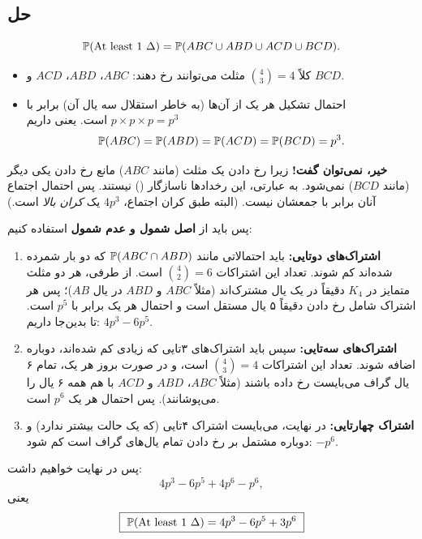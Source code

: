 \begin{center}
\end{center}

\subsection*{حل}
\[
\mathbb{P}(\text{At least 1 }\Delta)=\mathbb{P}(ABC\cup ABD\cup ACD\cup BCD).
\]
\begin{itemize}
\item کلاً $\binom43=4$ مثلث می‌توانند رخ دهند: $ABC$، $ABD$، $ACD$ و $BCD$.
\item احتمال تشکیل هر یک از آن‌ها (به خاطر استقلال سه یال آن) برابر با $p\times p\times p=p^3$ است. یعنی داریم
\[\mathbb{P}(ABC)=\mathbb{P}(ABD)=\mathbb{P}(ACD)=\mathbb{P}(BCD)=p^3 .\]
\end{itemize}

\begin{question}[آیا می‌توان گفت $\Prob(\text{At least 1 }\Delta)=4p^3$ ؟]
\begin{answer}
\textbf{خیر، نمی‌توان گفت!} زیرا رخ دادن یک مثلث (مانند $ABC$) مانع رخ دادن یکی دیگر (مانند $BCD$) نمی‌شود. به عبارتی، این رخدادها ناسازگار () نیستند. پس احتمال اجتماع آنان برابر با جمعشان نیست. (البته طبق کران اجتماع، $4p^3$ یک \emph{کران بالا} است.)
\end{answer}
\end{question}

پس باید از \textbf{اصل شمول و عدم شمول} استفاده کنیم:
\begin{enumerate}
\item \textbf{اشتراک‌های دوتایی:} باید احتمالاتی مانند $\mathbb{P}(ABC\cap ABD)$ که دو بار شمرده شده‌اند کم شوند. تعداد این اشتراکات $\binom42=6$ است. از طرفی، هر دو مثلث متمایز در $K_4$ دقیقاً در یک یال مشترک‌اند (مثلاً $ABC$ و $ABD$ در یال $AB$)؛ پس هر اشتراک شامل رخ دادن دقیقاً ۵ یال مستقل است و احتمال هر یک برابر با $p^5$ است. تا بدین‌جا داریم: $4p^3-6p^5$.
\item \textbf{اشتراک‌های سه‌تایی:} سپس باید اشتراک‌های ۳تایی که زیادی کم شده‌اند، دوباره اضافه شوند. تعداد این اشتراکات $\binom43=4$ است، و در صورت بروز هر یک، تمام ۶ یال گراف می‌بایست رخ داده باشند (مثلاً $ABC$، $ABD$ و $ACD$ با هم همه ۶ یال را می‌پوشانند). پس احتمال هر یک $p^6$ است.
\item \textbf{اشتراک چهارتایی:} در نهایت، می‌بایست اشتراک ۴تایی (که یک حالت بیشتر ندارد) و دوباره مشتمل بر رخ دادن تمام یال‌های گراف است کم شود: $-p^6$.
\end{enumerate}
پس در نهایت خواهیم داشت:
\[
4p^3-6p^5+4p^6-p^6 ,
\]
یعنی
\[
\boxed{\ \mathbb{P}(\text{At least 1 }\Delta)=4p^3-6p^5+3p^6\ }
\]

